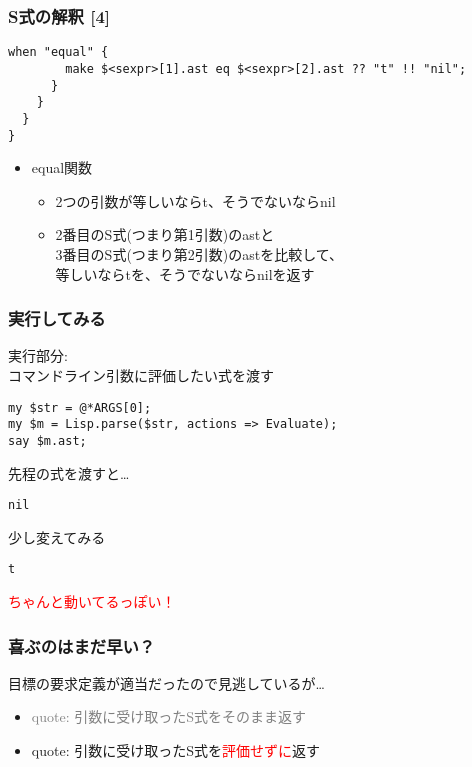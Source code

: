 \documentclass[14pt,dvipdfm,trans]{beamer}
\begin{document}
\begin{frame}[fragile]
\frametitle{S式の解釈 [4]}
\begin{lstlisting}[firstnumber=16]
       when "equal" {
        make $<sexpr>[1].ast eq $<sexpr>[2].ast ?? "t" !! "nil";
      }
    }
  }
}
\end{lstlisting}
\begin{itemize}
 \item <2-> equal関数
       \vspace*{0.5zh}
       \begin{itemize}
	\item <3-> 2つの引数が等しいならt、そうでないならnil
	\item <4-> 2番目のS式(つまり第1引数)のastと\\
	      3番目のS式(つまり第2引数)のastを比較して、\\
	      等しいならtを、そうでないならnilを返す
       \end{itemize}
\end{itemize}
\end{frame}

\begin{frame}[fragile]
 \frametitle{実行してみる}
実行部分:\\
\pause
\hspace*{1zh}
コマンドライン引数に評価したい式を渡す
\begin{lstlisting}
my $str = @*ARGS[0];
my $m = Lisp.parse($str, actions => Evaluate);
say $m.ast;
\end{lstlisting}
\pause
先程の式を渡すと…
\begin{lstlisting}[numbers=none]
% perl6 lisp.pl "(equal (car '(1 2)) 2)"
nil
\end{lstlisting}
\pause
少し変えてみる
\begin{lstlisting}[numbers=none]
% perl6 lisp.pl "(equal (car '(1 2)) 1)"
t
\end{lstlisting}
\pause
\begin{center}
\textcolor{red}{\large{ちゃんと動いてるっぽい！}}
\end{center}
\end{frame}

\begin{frame}
 \frametitle{喜ぶのはまだ早い？}
\begin{center}
 目標の要求定義が適当だったので見逃しているが…\\
\end{center} 
\pause
\begin{itemize}
 \item <3-> \textcolor<4->{gray}{quote: 引数に受け取ったS式をそのまま返す}
 \item <4-> quote: 引数に受け取ったS式を\textcolor{red}{評価せずに}返す
\end{itemize}
\end{frame}
\end{document}
